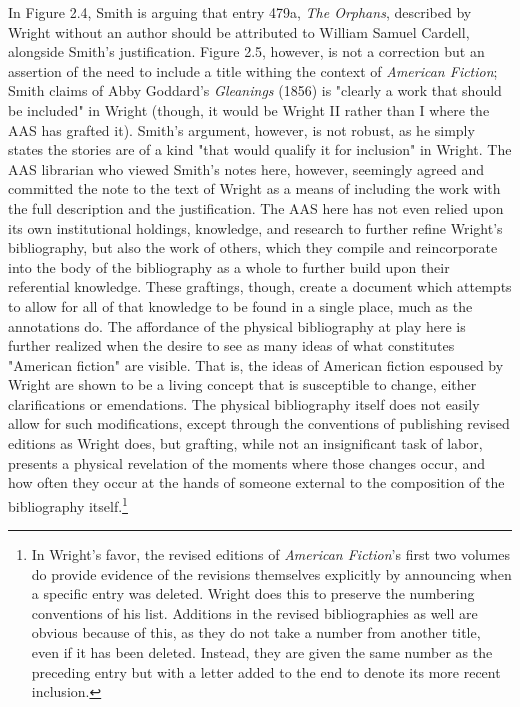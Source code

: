 In Figure 2.4, Smith is arguing that entry 479a, \textit{The Orphans}, described by Wright without an author should be attributed to William Samuel Cardell, alongside Smith's justification. Figure 2.5, however, is not a correction but an assertion of the need to include a title withing the context of \textit{American Fiction}; Smith claims of Abby Goddard's \textit{Gleanings} (1856) is "clearly a work that should be included" in Wright (though, it would be Wright II rather than I where the AAS has grafted it). Smith's argument, however, is not robust,  as he simply states the stories are of a kind "that would qualify it for inclusion" in Wright.\autocite[407]{nolan_e._smith_author-identification_1971}
 The AAS librarian who viewed Smith's notes here, however, seemingly agreed and committed the note to the text of Wright as a means of including the work with the full description and the justification. The AAS here has not even relied upon its own institutional holdings, knowledge, and research to further refine Wright's bibliography, but also the work of others, which they compile and reincorporate into the body of the bibliography as a whole to further build upon their referential knowledge. These graftings, though, create a document which attempts to allow for all of that knowledge to be found in a single place, much as the annotations do. The affordance of the physical bibliography at play here is further realized when the desire to see as many ideas of what constitutes "American fiction" are visible. That is, the ideas of American fiction espoused by Wright are shown to be a living concept that is susceptible to change, either clarifications or emendations. The physical bibliography itself does not easily allow for such modifications, except through the conventions of publishing revised editions as Wright does, but grafting, while not an insignificant task of labor, presents a physical revelation of the moments where those changes occur, and how often they occur at the hands of someone external to the composition of the bibliography itself.\footnote{In Wright's favor, the revised editions of \textit{American Fiction}'s first two volumes do provide evidence of the revisions themselves explicitly by announcing when a specific entry was deleted. Wright does this to preserve the numbering conventions of his list. Additions in the revised bibliographies as well are obvious because of this, as they do not take a number from another title, even if it has been deleted. Instead, they are given the same number as the preceding entry but with a letter added to the end to denote its more recent inclusion.} 
 
